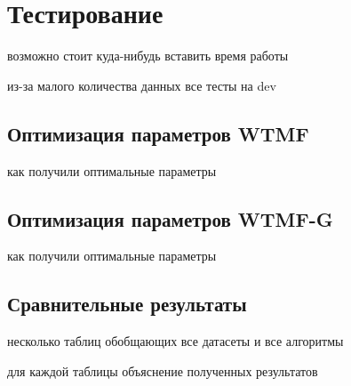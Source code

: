 \section{Тестирование}
    возможно стоит куда-нибудь вставить время работы

    из-за малого количества данных все тесты на dev

    \subsection{Оптимизация параметров WTMF}
        как получили оптимальные параметры

    \subsection{Оптимизация параметров WTMF-G}
        как получили оптимальные параметры

    \subsection{Сравнительные результаты}
        несколько таблиц обобщающих все датасеты и все алгоритмы

        для каждой таблицы объяснение полученных результатов